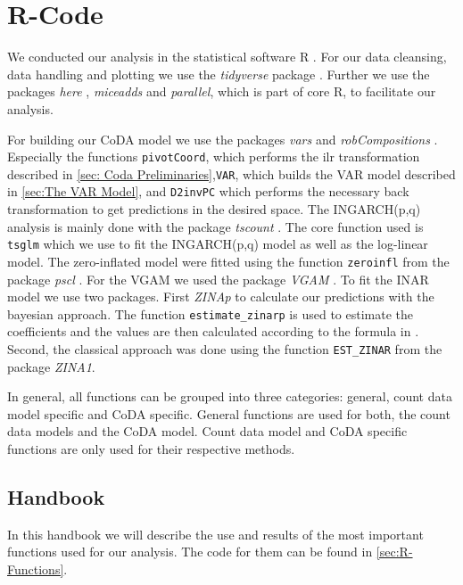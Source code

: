 \section{R-Code}
\label{sec:R-Code}

We conducted our analysis in the statistical software R \cite{R:2022}. For our data cleansing, data handling and plotting we use the \textit{tidyverse} package \cite{Tidyverse:2019}. Further we use the packages \textit{here} \cite{here:2020}, \textit{miceadds} \cite{Miceadds:2023} and \textit{parallel}, which is part of core R, to facilitate our analysis.  

For building our CoDA model we use the packages \textit{vars} \cite{VAR:2008,CoDAR2:2008} and \textit{robCompositions} \cite{RobComp:2011,CoDAR4:2018}. Especially the functions \texttt{pivotCoord}, which performs the ilr transformation described in \ref{sec: Coda Preliminaries},\texttt{VAR}, which builds the VAR model described in \ref{sec:The VAR Model}, and \texttt{D2invPC} which performs the necessary back transformation to get predictions in the desired space. The INGARCH(p,q) analysis is mainly done with the package \textit{tscount} \cite{Tscount:2017,Tscount:2020}. The core function used is \texttt{tsglm} which we use to fit the INGARCH(p,q) model as well as the log-linear model. The zero-inflated model were fitted using the function \texttt{zeroinfl} from the package \textit{pscl} \cite{Pscl:2008}. For the VGAM we used the package \textit{VGAM} \cite{RVGAM:2010}. To fit the INAR model we use two packages. First \textit{ZINAp} to calculate our predictions with the bayesian approach. The function \texttt{estimate\_zinarp} is used to estimate the coefficients and the values are then calculated according to the formula in \cite{Silva:2009}. Second, the classical approach was done using the function \texttt{EST\_ZINAR} from the package \textit{ZINA1}.

In general, all functions can be grouped into three categories: general, count data model specific and CoDA specific. General functions are used for both, the count data models and the CoDA model. Count data model and CoDA specific functions are only used for their respective methods.
\subsection{Handbook}
\label{sec:Handbook}

In this handbook we will describe the use and results of the most important functions used for our analysis.  The code for them can be found in \ref{sec:R-Functions}. 


